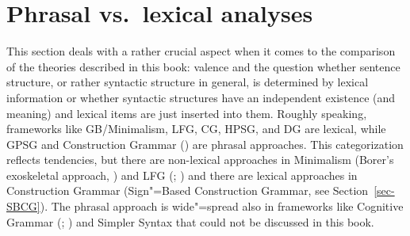 

\chapter{Phrasal vs.\ lexical analyses}
\label{Abschnitt-Phrasal-Lexikalisch}


This section deals with a rather crucial aspect when it comes to the comparison of the theories
described in this book: valence and the question whether sentence structure, or rather syntactic
structure in general, is determined by lexical information or whether syntactic structures have an
independent existence (and meaning) and lexical items are just inserted into them. Roughly speaking,
frameworks like GB/Minimalism, LFG, CG, HPSG, and DG are lexical, while GPSG and Construction
Grammar (\citealp{Goldberg95a,Goldberg2003b,Tomasello2003a,Tomasello2006c,Croft2001a}) are
phrasal approaches. This categorization reflects tendencies, but there are non-lexical 
approaches in Minimalism (Borer's exoskeletal approach, \citeyear{Borer2003a-u}) and LFG
(\citealp{Alsina96a}; \citealp{ADT2008a,ADT2013a}) and there are lexical approaches in Construction
Grammar (Sign"=Based Construction Grammar, see Section~\ref{sec-SBCG}). The phrasal approach is
wide"=spread also in frameworks like Cognitive Grammar (\citealp{Dabrowska2001a}; \citealp[]{Langacker2009a})
 and Simpler Syntax \citep{CJ2005a,Jackendoff2008a} that could not be discussed in this book.

